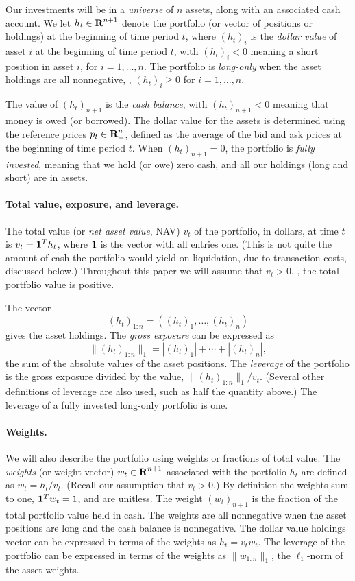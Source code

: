 \documentclass[openany]{article}  %
\begin{document}
Our investments will be in a \emph{universe} of $n$ assets,
along with an associated cash account.
We let $h_t \in {\mbox{\bf R}}^{n+1}$ denote the portfolio
(or vector of positions or holdings) at the beginning of time period $t$,
where $(h_t)_i$ is the \emph{dollar
value} of asset $i$ at the beginning of time period $t$, with $(h_t)_i <0$
meaning a short position in asset $i$, for $i=1, \ldots, n$.
The portfolio is \emph{long-only} when the asset holdings are all
nonnegative, \ie, $(h_t)_i \geq 0$ for $i=1, \ldots, n$.

The value of $(h_t)_{n+1}$ is the \emph{cash balance},
with $(h_t)_{n+1}<0$ meaning that money is owed (or borrowed).
The dollar value for the assets
is determined using the reference prices $p_t \in {\mbox{\bf R}}^n_+$,
defined as the average of the bid and ask prices at the beginning of
time period $t$.
When $(h_t)_{n+1}=0$, the portfolio is \emph{fully invested}, meaning that
we hold (or owe) zero cash, and all our holdings (long and short) are in
assets.

\paragraph{Total value, exposure, and leverage.}
The total value (or \emph{net asset value}, NAV)
$v_t$ of the portfolio, in dollars,
at time $t$ is $v_t = \mathbf 1^Th_t$, where
$\mathbf 1$ is the vector with all entries one.
(This is not quite the amount of cash the portfolio would yield on liquidation,
due to transaction costs, discussed below.)
Throughout this paper we will assume that $v_t>0$, \ie, the total
portfolio value is positive.

The vector
\[
(h_t)_{1:n} = ((h_t)_1, \ldots, (h_t)_n)
\]
gives the asset holdings.
The \emph{gross exposure} can be expressed as
\[
\|(h_t)_{1:n}\|_1 = |(h_t)_1| + \cdots + |(h_t)_n|,
\]
the sum of the absolute values of the asset positions.
The \emph{leverage} of the portfolio is the gross exposure divided by
the value, $\|(h_t)_{1:n}\|_1/v_t$.
(Several other definitions of leverage are also used, such as
half the quantity above.)
The leverage of a fully invested long-only portfolio is one.

\paragraph{Weights.}
We will also describe the portfolio using weights or fractions
of total value.
The \emph{weights} (or weight vector) $w_t \in {\mbox{\bf R}}^{n+1}$
associated with the portfolio $h_t$ are defined as
$w_t = h_t/v_t$. (Recall our assumption that $v_t>0$.)
By definition the weights sum to one, $\mathbf 1^Tw_t=1$, and are unitless.
The weight $(w_t)_{n+1}$ is the fraction of the total portfolio
value held in cash.
The weights are all nonnegative when the asset positions
are long and the cash balance is nonnegative.
The dollar value holdings vector can be expressed in terms of the weights
as $h_t = v_t w_t$.
The leverage of the portfolio can be expressed in terms of the
weights as $\|w_{1:n}\|_1$, the $\ell_1$-norm of the asset weights.
\end{document}
